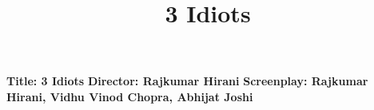 \documentclass[10.5pt, a4paper]{article}
\title{3 Idiots}
\begin{document}
\maketitle
\textbf{Title: 3 Idiots}
\textbf{Director: Rajkumar Hirani}
\textbf{Screenplay: Rajkumar Hirani, Vidhu Vinod Chopra, Abhijat Joshi}
\end{document}

